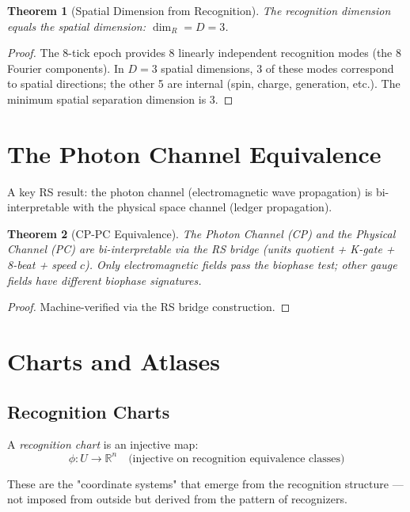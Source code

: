 \documentclass[12pt,a4paper]{article}
\newtheorem{theorem}{Theorem}[section]
\theoremstyle{definition}
\theoremstyle{remark}
\begin{document}
\begin{theorem}[Spatial Dimension from Recognition]
The recognition dimension equals the spatial dimension: $\dim_R = D = 3$.
\end{theorem}

\begin{proof}
The 8-tick epoch provides 8 linearly independent 
recognition modes (the 8 Fourier components). In $D = 3$ spatial dimensions, 
3 of these modes correspond to spatial directions; the other 5 are internal 
(spin, charge, generation, etc.). The minimum spatial separation dimension is 3.
\end{proof}

\section{The Photon Channel Equivalence}

A key RS result: the photon channel (electromagnetic wave propagation) is 
bi-interpretable with the physical space channel (ledger propagation).

\begin{theorem}[CP-PC Equivalence]
The Photon Channel (CP) and the Physical Channel 
(PC) are bi-interpretable via the RS bridge (units quotient + K-gate + 8-beat + speed $c$).
Only electromagnetic fields pass the biophase test; other gauge fields have 
different biophase signatures.
\end{theorem}

\begin{proof}
Machine-verified via the RS bridge construction.
\end{proof}

\section{Charts and Atlases}

\subsection{Recognition Charts}

A \emph{recognition chart} is an injective map:
\begin{equation}
\phi: U \to \mathbb{R}^n \quad \text{(injective on recognition equivalence classes)}
\end{equation}

These are the "coordinate systems" that emerge from the recognition structure — 
not imposed from outside but derived from the pattern of recognizers.
\end{document}
